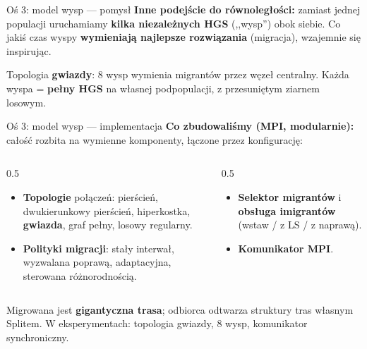 \documentclass[aspectratio=169,11pt]{beamer}
\begin{document}
\begin{frame}{Oś 3: model wysp — pomysł}
  \textbf{Inne podejście do równoległości:} zamiast jednej populacji uruchamiamy \textbf{kilka niezależnych HGS} (,,wysp'') obok siebie. Co jakiś czas wyspy \textbf{wymieniają najlepsze rozwiązania} (migracja), wzajemnie się inspirując.
  \vfill
  \centering
  \vfill
  {\footnotesize Topologia \textbf{gwiazdy}: 8 wysp wymienia migrantów przez węzeł centralny. Każda wyspa = \textbf{pełny HGS} na własnej podpopulacji, z przesuniętym ziarnem losowym.}
\end{frame}

\begin{frame}{Oś 3: model wysp — implementacja}
  \textbf{Co zbudowaliśmy (MPI, modularnie):} całość rozbita na wymienne komponenty, łączone przez konfigurację:
  \vfill
  \begin{columns}[T]
    \begin{column}{0.5\textwidth}
      \begin{itemize}
        \item \textbf{Topologie} połączeń: pierścień, dwukierunkowy pierścień, hiperkostka, \textbf{gwiazda}, graf pełny, losowy regularny.
        \item \textbf{Polityki migracji}: stały interwał, wyzwalana poprawą, adaptacyjna, sterowana różnorodnością.
      \end{itemize}
    \end{column}
    \begin{column}{0.5\textwidth}
      \begin{itemize}
        \item \textbf{Selektor migrantów} i \textbf{obsługa imigrantów} (wstaw / z LS / z naprawą).
        \item \textbf{Komunikator MPI}.
      \end{itemize}
    \end{column}
  \end{columns}
  \vfill
  {\footnotesize Migrowana jest \textbf{gigantyczna trasa}; odbiorca odtwarza struktury tras własnym Splitem. W eksperymentach: topologia gwiazdy, 8 wysp, komunikator synchroniczny.}
\end{frame}
\end{document}
